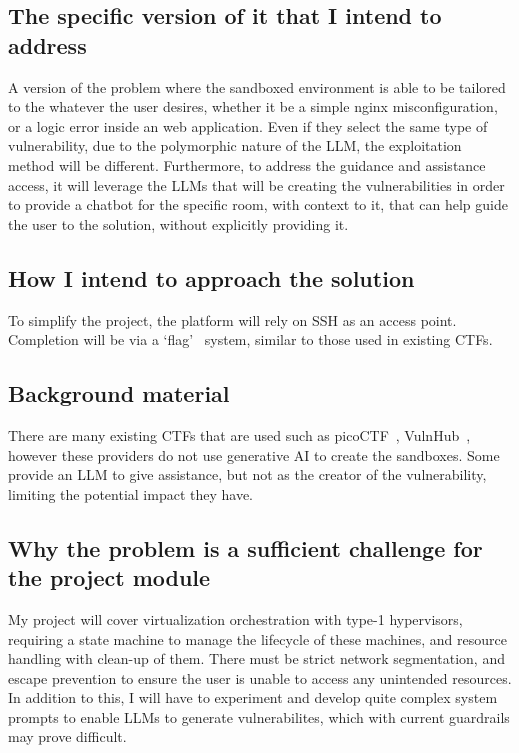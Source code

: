 \documentclass[serif,oneside,single,parskip,raggedright,numeric]{qproposal}
\begin{document}
\subsection*{The specific version of it that I intend to address}

A version of the problem where the sandboxed environment is able to be tailored to the
whatever the user desires, whether it be a simple nginx misconfiguration, or a logic error
inside an web application. Even if they select the same type of vulnerability, due to the
polymorphic nature of the LLM, the exploitation method will be different. Furthermore, to
address the guidance and assistance access, it will leverage the LLMs that will be creating
the vulnerabilities in order to provide a chatbot for the specific room, with context to it,
that can help guide the user to the solution, without explicitly providing it.

\subsection*{How I intend to approach the solution}

To simplify the project, the platform will rely on SSH as an access point. Completion will
be via a `flag'~\citep{ctf-wikipedia} system, similar to those used in existing CTFs.

\subsection*{Background material}

There are many existing CTFs that are used such as picoCTF~\citep{picoctf},
VulnHub~\citep{vulnhub}, however these providers do not use generative AI to create the
sandboxes. Some provide an LLM to give assistance, but not as the creator of the
vulnerability, limiting the potential impact they have.

\subsection*{Why the problem is a sufficient challenge for the project module}

My project will cover virtualization orchestration with type-1 hypervisors, requiring a
state machine to manage the lifecycle of these machines, and resource handling with clean-up
of them. There must be strict network segmentation, and escape prevention to ensure the user
is unable to access any unintended resources. In addition to this, I will have to experiment
and develop quite complex system prompts to enable LLMs to generate vulnerabilites, which
with current guardrails may prove difficult.
\end{document}
